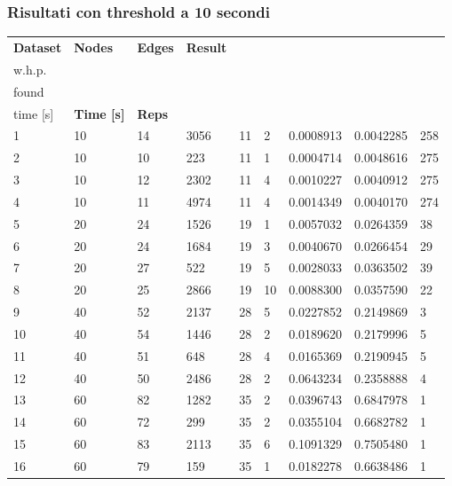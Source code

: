\subsubsection{Risultati con threshold a 10 secondi}
\begin{longtable}{lllllllll}
  \textbf{Dataset} & \textbf{Nodes} & \textbf{Edges} & \textbf{Result} & \textbf{\begin{tabular}[c]{@{}l@{}}Rep\\ w.h.p.\end{tabular}} & \textbf{\begin{tabular}[c]{@{}l@{}}Mincut\\ found\end{tabular}} & \textbf{\begin{tabular}[c]{@{}l@{}}Discovery\\ time {[}s{]}\end{tabular}} & \textbf{Time {[}s{]}} & \textbf{Reps} \\
  \endhead
  1 & 10 & 14 & 3056 & 11 & 2 & 0.0008913 & 0.0042285 & 258 \\
  2 & 10 & 10 & 223 & 11 & 1 & 0.0004714 & 0.0048616 & 275 \\
  3 & 10 & 12 & 2302 & 11 & 4 & 0.0010227 & 0.0040912 & 275 \\
  4 & 10 & 11 & 4974 & 11 & 4 & 0.0014349 & 0.0040170 & 274 \\
  5 & 20 & 24 & 1526 & 19 & 1 & 0.0057032 & 0.0264359 & 38 \\
  6 & 20 & 24 & 1684 & 19 & 3 & 0.0040670 & 0.0266454 & 29 \\
  7 & 20 & 27 & 522 & 19 & 5 & 0.0028033 & 0.0363502 & 39 \\
  8 & 20 & 25 & 2866 & 19 & 10 & 0.0088300 & 0.0357590 & 22 \\
  9 & 40 & 52 & 2137 & 28 & 5 & 0.0227852 & 0.2149869 & 3 \\
  10 & 40 & 54 & 1446 & 28 & 2 & 0.0189620 & 0.2179996 & 5 \\
  11 & 40 & 51 & 648 & 28 & 4 & 0.0165369 & 0.2190945 & 5 \\
  12 & 40 & 50 & 2486 & 28 & 2 & 0.0643234 & 0.2358888 & 4 \\
  13 & 60 & 82 & 1282 & 35 & 2 & 0.0396743 & 0.6847978 & 1 \\
  14 & 60 & 72 & 299 & 35 & 2 & 0.0355104 & 0.6682782 & 1 \\
  15 & 60 & 83 & 2113 & 35 & 6 & 0.1091329 & 0.7505480 & 1 \\
  16 & 60 & 79 & 159 & 35 & 1 & 0.0182278 & 0.6638486 & 1 \\

\end{longtable}
